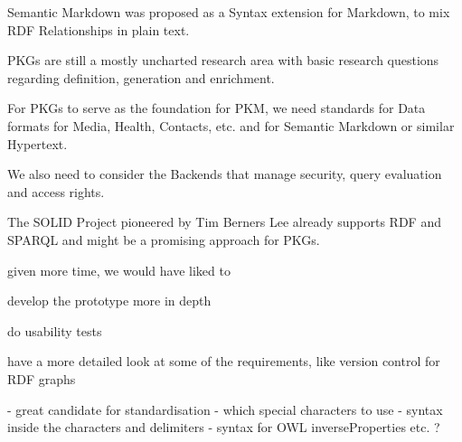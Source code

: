 Semantic Markdown was proposed as a Syntax extension for Markdown, to mix RDF Relationships in plain text.

PKGs are still a mostly uncharted research area with basic research questions regarding definition, generation and enrichment. 

For PKGs to serve as the foundation for PKM, we need standards for Data formats for Media, Health, Contacts, etc. and for Semantic Markdown or similar Hypertext.

We also need to consider the Backends that manage security, query evaluation and access rights. 

The SOLID Project pioneered by Tim Berners Lee already supports RDF and SPARQL and might be a promising approach for PKGs.



given more time, we would have liked to 

develop the prototype more in depth

do usability tests

have a more detailed look at some of the requirements, like version control  for RDF graphs

- great candidate for standardisation
    - which special characters to use
    - syntax inside the characters and delimiters
- syntax for OWL inverseProperties etc. ?